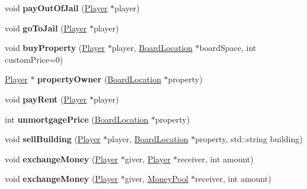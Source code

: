 \begin{DoxyCompactItemize}
\item 
\hypertarget{classGame_acfd0ba61eab215f7523d84c686169634}{void {\bfseries pay\-Out\-Of\-Jail} (\hyperlink{classPlayer}{Player} $\ast$player)}\label{classGame_acfd0ba61eab215f7523d84c686169634}

\item 
\hypertarget{classGame_ac690c496aaa706d4ce69e3d759541437}{void {\bfseries go\-To\-Jail} (\hyperlink{classPlayer}{Player} $\ast$player)}\label{classGame_ac690c496aaa706d4ce69e3d759541437}

\item 
\hypertarget{classGame_a214c5959c9c2ae8c7d3448eb7f3aad6c}{void {\bfseries buy\-Property} (\hyperlink{classPlayer}{Player} $\ast$player, \hyperlink{classBoardLocation}{Board\-Location} $\ast$board\-Space, int custom\-Price=0)}\label{classGame_a214c5959c9c2ae8c7d3448eb7f3aad6c}

\item 
\hypertarget{classGame_a21b494395fb4c92040c0e83c3785029e}{\hyperlink{classPlayer}{Player} $\ast$ {\bfseries property\-Owner} (\hyperlink{classBoardLocation}{Board\-Location} $\ast$property)}\label{classGame_a21b494395fb4c92040c0e83c3785029e}

\item 
\hypertarget{classGame_addaa926d4a862fa154e404fbd9571f14}{void {\bfseries pay\-Rent} (\hyperlink{classPlayer}{Player} $\ast$player)}\label{classGame_addaa926d4a862fa154e404fbd9571f14}

\item 
\hypertarget{classGame_a576aa36953d90f05a872232fceaae6f5}{int {\bfseries unmortgage\-Price} (\hyperlink{classBoardLocation}{Board\-Location} $\ast$property)}\label{classGame_a576aa36953d90f05a872232fceaae6f5}

\item 
\hypertarget{classGame_abc26d164ec30fbbd1c51d4d6155e813f}{void {\bfseries sell\-Building} (\hyperlink{classPlayer}{Player} $\ast$player, \hyperlink{classBoardLocation}{Board\-Location} $\ast$property, std\-::string building)}\label{classGame_abc26d164ec30fbbd1c51d4d6155e813f}

\item 
\hypertarget{classGame_a2ced4c057290479780767c7fb3ec7fab}{void {\bfseries exchange\-Money} (\hyperlink{classPlayer}{Player} $\ast$giver, \hyperlink{classPlayer}{Player} $\ast$receiver, int amount)}\label{classGame_a2ced4c057290479780767c7fb3ec7fab}

\item 
\hypertarget{classGame_abd6ab3f188fc8b92464d2ab49c4665e2}{void {\bfseries exchange\-Money} (\hyperlink{classPlayer}{Player} $\ast$giver, \hyperlink{classMoneyPool}{Money\-Pool} $\ast$receiver, int amount)}\label{classGame_abd6ab3f188fc8b92464d2ab49c4665e2}


\end{DoxyCompactItemize}
